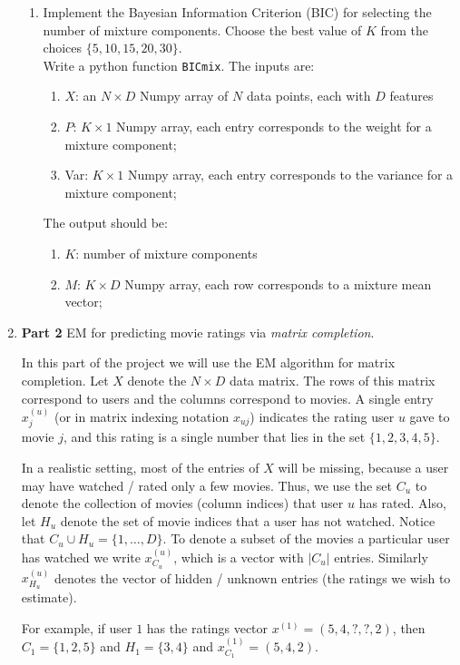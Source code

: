 \begin{enumerate}
\begin{enumerate}
\item Implement the Bayesian Information Criterion (BIC) for selecting the number of mixture components. Choose the best value of $K$ from the choices $\{ 5, 10, 15, 20 , 30\}$.\\
    Write a python function \texttt{BICmix}. The inputs are:
    \begin{enumerate}
    \item $X$: an $N \times D$ Numpy array of $N$ data points, each with $D$ features
    \item $P$: $K \times 1$ Numpy array, each entry corresponds to the weight for a mixture component;
    \item Var: $K \times 1$ Numpy array, each entry corresponds to the variance for a mixture component;
    \end{enumerate}
    The output should be:
    \begin{enumerate}
    \item $K$: number of mixture components
    \item $M$: $K \times D$ Numpy array, each row corresponds to a mixture mean vector;
    \end{enumerate}
\end{enumerate}

\item {\bf Part 2} EM for predicting movie ratings via \emph{matrix completion}.

In this part of the project we will use the EM algorithm for matrix completion. Let $X$ denote the $N \times D$ data matrix. The rows of this matrix correspond to users and the columns correspond to movies. A single entry $x^{(u)}_{j}$ (or in matrix indexing notation $x_{uj}$) indicates the rating user $u$ gave to movie $j$, and this rating is a single number that lies in the set $\{1,2,3,4,5\}$.

In a realistic setting, most of the entries of $X$ will be missing, because a user may have watched / rated only a few movies. Thus, we use the set $C_{u}$ to denote the collection of movies (column indices) that user $u$ has rated. Also, let $H_{u}$ denote the set of movie indices that a user has not watched. Notice that $C_{u} \cup H_{u} = \{1,\ldots,D\}$. To denote a subset of the movies a particular user has watched we write $x_{C_u}^{(u)}$, which is a vector with $|C_u|$ entries. Similarly $x_{H_u}^{(u)}$ denotes the vector of hidden / unknown entries (the ratings we wish to estimate).

For example, if user $1$ has the ratings vector $x^{(1)} =  (5, 4, ?, ?, 2)$, then $C_{1} = \{1, 2, 5\}$ and $H_{1} = \{ 3, 4\}$ and $x^{(1)}_{C_1} = (5, 4, 2)$.


\end{enumerate}
